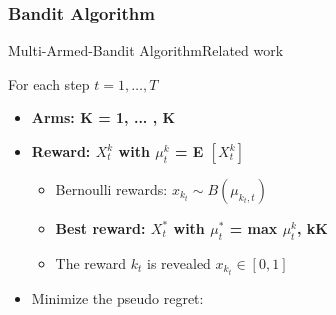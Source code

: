 \subsubsection{Bandit Algorithm}
\begin{frame}{Multi-Armed-Bandit Algorithm}{Related work}



 For each step $t=1, \dots, T$
\begin{itemize}
	\item \bf{Arms:} K = {1, ... , K}
	\item \bf{Reward:} $X^{k}_{t}$ with $\mu^{k}_{t}$ = E $[X^{k}_{t}]$
	\begin{itemize}
		\item Bernoulli rewards: $x_{k_{t}} \sim B\left(\mu_{k_{t}, t}\right)$
		\item \bf{Best reward:} $X^{*}_{t}$ with $\mu^{*}_{t}$ = max $\mu^{k}_{t}$,  k\in  K
		\item The reward $k_{t}$ is revealed $x_{k_{t}} \in[0,1]$
	\end{itemize}
\item  Minimize the pseudo regret:
\end{itemize}

\end{frame}

